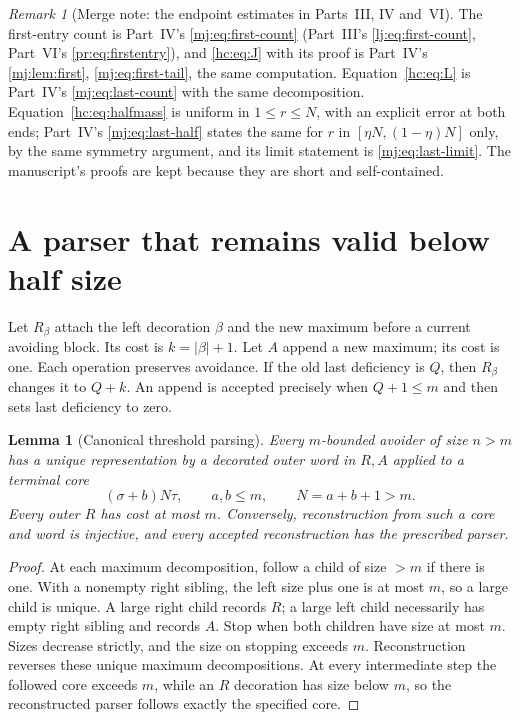 \documentclass[11pt,a4paper]{article}
\newtheorem{lemma}[lemma]{Lemma}
\theoremstyle{definition}\newaliascnt{definition}{theorem}
\theoremstyle{remark}\newaliascnt{remark}{theorem}
\newtheorem{remark}[remark]{Remark}
\begin{document}
\begin{remark}[Merge note: the endpoint estimates in Parts~III, IV and~VI]
The first-entry count is Part~IV's \eqref{mj:eq:first-count}
(Part~III's \eqref{lj:eq:first-count}, Part~VI's \eqref{pr:eq:firstentry}),
and \eqref{hc:eq:J} with its proof is Part~IV's \cref{mj:lem:first},
\eqref{mj:eq:first-tail}, the same computation. Equation~\eqref{hc:eq:L} is Part~IV's
\eqref{mj:eq:last-count} with the same decomposition. Equation~\eqref{hc:eq:halfmass}
is uniform in $1\le r\le N$, with an explicit error at both ends; Part~IV's
\eqref{mj:eq:last-half} states the same for $r$ in $[\eta N,(1-\eta)N]$
only, by the same symmetry argument, and its limit statement is
\eqref{mj:eq:last-limit}. The manuscript's proofs are kept because they are
short and self-contained.
\end{remark}

\section{A parser that remains valid below half size}
\label{hc:sec:parser}
Let $R_\beta$ attach the left decoration $\beta$ and the new maximum before a
current avoiding block. Its cost is $k=|\beta|+1$. Let $A$ append a new
maximum; its cost is one. Each operation preserves avoidance. If the old last
deficiency is $Q$, then $R_\beta$ changes it to $Q+k$. An append is accepted
precisely when $Q+1\le m$ and then sets last deficiency to zero.

\begin{lemma}[Canonical threshold parsing]\label{hc:lem:parser}
Every $m$-bounded avoider of size $n>m$ has a unique representation by a
decorated outer word in $R,A$ applied to a terminal core
\[
 (\sigma+b)N\tau,\qquad a,b\le m,
 \qquad N=a+b+1>m.
\]
Every outer $R$ has cost at most $m$. Conversely, reconstruction from such a
core and word is injective, and every accepted reconstruction has the
prescribed parser.
\end{lemma}
\begin{proof}
At each maximum decomposition, follow a child of size $>m$ if there is one.
With a nonempty right sibling, the left size plus one is at most $m$, so a
large child is unique. A large right child records $R$; a large left child
necessarily has empty right sibling and records $A$. Stop when both children
have size at most $m$. Sizes decrease strictly, and the size on stopping
exceeds $m$. Reconstruction reverses these unique maximum decompositions. At
every intermediate step the followed core exceeds $m$, while an $R$
decoration has size below $m$, so the reconstructed parser follows exactly
the specified core.
\end{proof}
\end{document}
